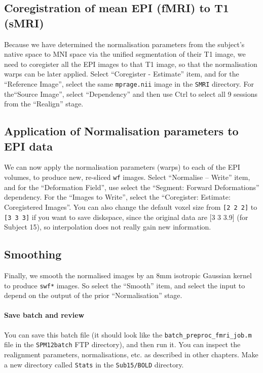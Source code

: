 \subsection{Coregistration of mean EPI (fMRI) to T1 (sMRI)}

Because we have determined the normalisation parameters from the subject's native space to MNI space via the unified segmentation of their T1 image, we need to coregister all the EPI images to that T1 image, so that the normalisation warps can be later applied. Select ``Coregister - Estimate'' item, and for the ``Reference Image'', select the same \texttt{mprage.nii} image in the \texttt{SMRI} directory. For the``Source Image'', select ``Dependency'' and then use Ctrl to select all 9 sessions from the ``Realign'' stage.

\subsection{Application of Normalisation parameters to EPI data}

We can now apply the normalisation parameters (warps) to each of the EPI volumes, to produce new, re-sliced \texttt{wf} images. Select ``Normalise -- Write'' item, and for the ``Deformation Field'', use select the ``Segment: Forward Deformations'' dependency. For the ``Images to Write'', select the ``Coregister: Estimate: Coregistered Images''. You can also change the default voxel size from \texttt{[2 2 2]} to \texttt{[3 3 3]} if you want to save diskspace, since the original data are [3 3 3.9] (for Subject 15), so interpolation does not really gain new information.

\subsection{Smoothing}

Finally, we smooth the normalised images by an 8mm isotropic Gaussian kernel to produce \texttt{swf*} images. So select the ``Smooth'' item, and select the input to depend on the output of the prior ``Normalisation'' stage.

\paragraph{Save batch and review}

You can save this batch file (it should look like the \texttt{batch\_preproc\_fmri\_job.m} file in the \texttt{SPM12batch} FTP directory), and then run it. You can inspect the realignment parameters, normalisations, etc. as described in other chapters. Make a new directory called \texttt{Stats} in the \texttt{Sub15/BOLD} directory.

